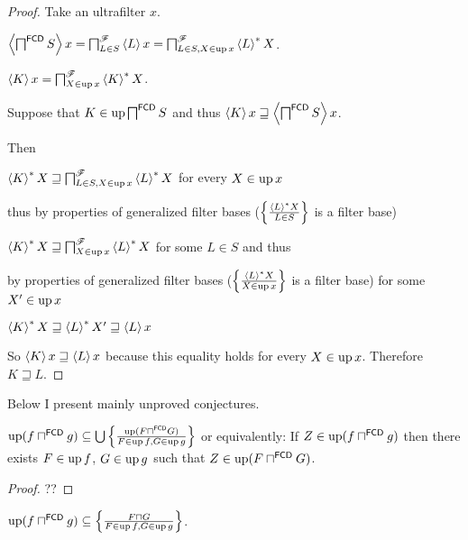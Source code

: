 \begin{proof}
  Take an ultrafilter $x$.
  
  $\left\langle \bigsqcap^{\mathsf{FCD}} S\right\rangle x =
  \bigsqcap^{\mathscr{F}}_{L \in S} \left\langle L\right\rangle x =
  \bigsqcap^{\mathscr{F}}_{L \in S, X \in \operatorname{up} x} \left\langle L\right\rangle ^{\ast} X$.
  
  $\left\langle K\right\rangle x = \bigsqcap^{\mathscr{F}}_{X \in \operatorname{up} x} \left\langle K\right\rangle ^{\ast}X$.
  
  Suppose that $K \in \operatorname{up} \bigsqcap^{\mathsf{FCD}} S$ and thus
  $\left\langle K\right\rangle x \sqsupseteq \left\langle 
  \bigsqcap^{\mathsf{FCD}} S \right\rangle x$.
  
  Then
  
  $\left\langle K\right\rangle ^{\ast} X \sqsupseteq \bigsqcap^{\mathscr{F}}_{L \in S, X
  \in \operatorname{up} x} \left\langle L\right\rangle ^{\ast} X$ for every $X \in \operatorname{up} x$
  
  thus by properties of generalized filter bases ($\left\{ \frac{ \left\langle L\right\rangle ^{\ast}X
  }{ L \in S }\right\}$ is a filter base)
  
  $\left\langle K\right\rangle ^{\ast} X \sqsupseteq \bigsqcap^{\mathscr{F}}_{X \in
  \operatorname{up} x} \left\langle L\right\rangle ^{\ast} X$ for some $L \in S$ and thus
  
  by properties of generalized filter bases ($\left\{ \frac{ \left\langle L\right\rangle ^{\ast}
  X }{ X \in \operatorname{up} x }\right\}$ is a filter base) for some $X' \in \operatorname{up} x$
  
  $\left\langle K\right\rangle ^{\ast} X \sqsupseteq \left\langle L\right\rangle ^{\ast} X'
  \sqsupseteq \left\langle L\right\rangle x$
  
  So $\left\langle K\right\rangle x \sqsupseteq \left\langle L\right\rangle x$ because this
  equality holds for every $X \in \operatorname{up} x$. Therefore $K \sqsupseteq L$.
\end{proof}

\noindent\makebox[\linewidth]{\rule{\paperwidth}{0.4pt}}

Below I present mainly unproved conjectures.

\begin{lem}
$\operatorname{up} (f \sqcap^{\mathsf{FCD}} g) \subseteq \bigcup \left\{ \frac{
\operatorname{up} (F \sqcap^{\mathsf{FCD}} G) }{ F \in \operatorname{up} f, G \in \operatorname{up} g }\right\}$
or equivalently: If $Z\in\operatorname{up} (f \sqcap^{\mathsf{FCD}} g)$ then there exists
$F \in \operatorname{up} f$, $G \in \operatorname{up} g$ such that $Z\in\operatorname{up} (F \sqcap^{\mathsf{FCD}} G)$.
\end{lem}

\begin{proof}
??
\end{proof}

\begin{prop}
$\operatorname{up} (f \sqcap^{\mathsf{FCD}} g) \subseteq \left\{ \frac{ F \sqcap G }{ F \in \operatorname{up} f, G \in \operatorname{up} g }\right\}$.
\end{prop}


